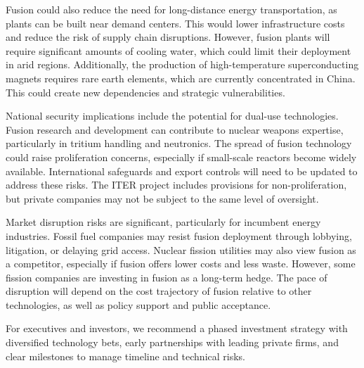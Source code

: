 \documentclass[10pt,a4paper]{article}
\begin{document}
{\small Fusion could also reduce the need for long-distance energy transportation, as plants can be built near demand centers. This would lower infrastructure costs and reduce the risk of supply chain disruptions. However, fusion plants will require significant amounts of cooling water, which could limit their deployment in arid regions. Additionally, the production of high-temperature superconducting magnets requires rare earth elements, which are currently concentrated in China. This could create new dependencies and strategic vulnerabilities.}\par
{\small National security implications include the potential for dual-use technologies. Fusion research and development can contribute to nuclear weapons expertise, particularly in tritium handling and neutronics. The spread of fusion technology could raise proliferation concerns, especially if small-scale reactors become widely available. International safeguards and export controls will need to be updated to address these risks. The ITER project includes provisions for non-proliferation, but private companies may not be subject to the same level of oversight.}\par
{\small Market disruption risks are significant, particularly for incumbent energy industries. Fossil fuel companies may resist fusion deployment through lobbying, litigation, or delaying grid access. Nuclear fission utilities may also view fusion as a competitor, especially if fusion offers lower costs and less waste. However, some fission companies are investing in fusion as a long-term hedge. The pace of disruption will depend on the cost trajectory of fusion relative to other technologies, as well as policy support and public acceptance.}\par
{\small For executives and investors, we recommend a phased investment strategy with diversified technology bets, early partnerships with leading private firms, and clear milestones to manage timeline and technical risks.}\par
\label{chap:2:end}
\end{document}
